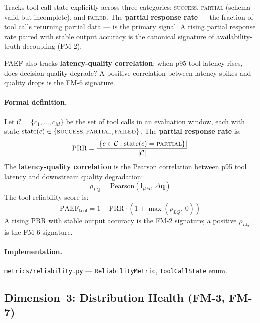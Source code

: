 \documentclass{article}
\begin{document}
Tracks tool call state explicitly across three categories: \textsc{success},
\textsc{partial} (schema-valid but incomplete), and \textsc{failed}.  The
\textbf{partial response rate} --- the fraction of tool calls returning partial
data --- is the primary signal.  A rising partial response rate paired with
stable output accuracy is the canonical signature of availability-truth
decoupling (FM-2).

PAEF also tracks \textbf{latency-quality correlation}: when p95 tool latency
rises, does decision quality degrade?  A positive correlation between latency
spikes and quality drops is the FM-6 signature.

\paragraph{Formal definition.}
Let $\mathcal{C} = \{c_1, \ldots, c_M\}$ be the set of tool calls in an evaluation
window, each with state $\text{state}(c) \in \{\textsc{success}, \textsc{partial},
\textsc{failed}\}$.  The \textbf{partial response rate} is:
\begin{equation}
  \text{PRR} = \frac{|\{c \in \mathcal{C} : \text{state}(c) = \textsc{partial}\}|}
                    {|\mathcal{C}|}
\end{equation}
The \textbf{latency-quality correlation} is the Pearson correlation between
p95 tool latency and downstream quality degradation:
\begin{equation}
  \rho_{LQ} = \text{Pearson}(\mathbf{l}_{p95},\, \Delta\mathbf{q})
\end{equation}
The tool reliability score is:
\begin{equation}
  \text{PAEF}_{\text{tool}} = 1 - \text{PRR} \cdot (1 + \max(\rho_{LQ},\, 0))
\end{equation}
A rising $\text{PRR}$ with stable output accuracy is the FM-2 signature;
a positive $\rho_{LQ}$ is the FM-6 signature.

\begin{sloppypar}\paragraph{Implementation.} \texttt{metrics/reliability.py} ---
\texttt{Reliability\-Metric}, \texttt{Tool\-Call\-State} enum.\end{sloppypar}

\subsection{Dimension~3: Distribution Health (FM-3, FM-7)}
\end{document}
